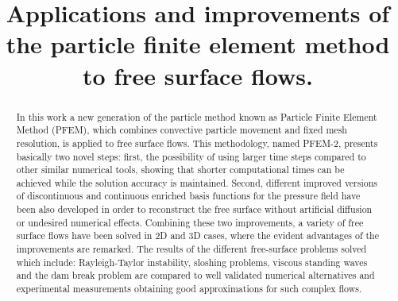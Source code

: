 \documentclass[a4paper,conference]{IEEEtran}
\begin{document}
\title{Applications and improvements of the particle finite element method to free surface flows.}


\author{
\and
{}
\and
{}
}


\maketitle

\begin{abstract}
In this work a new generation of the particle method known as Particle Finite Element Method (PFEM), which combines convective particle movement and fixed mesh resolution, is applied to free surface flows. This methodology, named PFEM-2, presents basically two novel steps: first, the possibility of using larger time steps compared to other similar numerical tools, showing that shorter computational times can be achieved while the solution accuracy is maintained. Second, different improved versions of discontinuous and continuous enriched basis functions for the pressure field have been also developed in order to reconstruct the free surface without artificial diffusion or undesired numerical effects. Combining these two improvements, a variety of free surface flows have been solved in 2D and 3D cases, where the evident advantages of the improvements are remarked.
The results of the different free-surface problems solved which include: Rayleigh-Taylor instability, sloshing problems, viscous standing waves and the dam break problem are compared to well validated numerical alternatives and experimental measurements obtaining good approximations for such complex flows.
\end{abstract}
\end{document}
